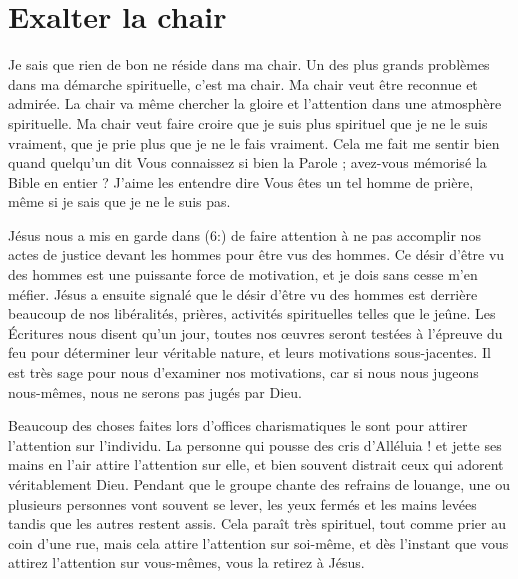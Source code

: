 \section{Exalter la chair}

Je sais que rien de bon ne réside dans ma chair.
 Un des plus grands problèmes dans ma démarche spirituelle, c'est ma chair.
 Ma chair veut être reconnue et admirée. La chair va même chercher
 la gloire et l'attention dans une atmosphère spirituelle.
 Ma chair veut faire croire que je suis plus spirituel que je ne le suis
 vraiment, que je prie plus que je ne le fais vraiment.
 Cela me fait me sentir bien quand quelqu'un dit\frcolon{}
 \Og Vous connaissez si bien la Parole ; avez-vous mémorisé la Bible
 en entier ? \Fg{} J'aime les entendre dire\frcolon{}
 \Og Vous êtes un tel homme de prière, \Fg{} même si je sais
 que je ne le suis pas.

Jésus nous a mis en garde dans (6:) de faire attention
 à ne pas accomplir nos actes de justice devant les hommes
 pour être vus des hommes. Ce désir \Og d'être vu des hommes \Fg{} est une
 puissante force de motivation, et je dois sans cesse m'en méfier.
 Jésus a ensuite signalé que le désir d'être vu des hommes
 est derrière beaucoup de nos libéralités, prières, activités spirituelles
 telles que le jeûne. Les Écritures nous disent qu'un jour,
 toutes nos œuvres seront testées à l'épreuve du feu pour déterminer
 leur véritable nature, et leurs motivations sous-jacentes.
 Il est très sage pour nous d'examiner nos motivations,
 car si nous nous jugeons nous-mêmes, nous ne serons pas jugés par Dieu.

Beaucoup des choses faites lors d'offices charismatiques
 le sont pour attirer l'attention sur l'individu.
 La personne qui pousse des cris \Og d'Alléluia ! \Fg{} et jette ses mains en l'air
 attire l'attention sur elle, et bien souvent distrait ceux qui adorent
 véritablement Dieu. Pendant que le groupe chante des refrains de louange,
 une ou plusieurs personnes vont souvent se lever, les yeux fermés
 et les mains levées tandis que les autres restent assis.
 Cela paraît très spirituel, tout comme prier au coin d'une rue,
 mais cela attire l'attention sur soi-même, et dès l'instant
 que vous attirez l'attention sur vous-mêmes, vous la retirez à Jésus.

